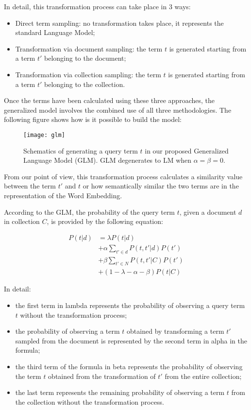 In detail, this transformation process can take place in 3 ways:
\begin{itemize}
    \item Direct term sampling: no transformation takes place, it represents the standard Language Model;
    \item Transformation via document sampling: the term $t$ is generated starting from a term ${t}'$ belonging to the document;
    \item Transformation via collection sampling: the term $t$ is generated starting from a term ${t}'$ belonging to the collection.
\end{itemize}

Once the terms have been calculated using these three approaches, the generalized model involves the combined use of all three methodologies.
The following figure shows how is it possible to build the model:

\begin{figure}[htp]
    \centering
    \texttt{[image: glm]}
    \caption[Generalized Language Model]{Schematics of generating a query term $t$ in our proposed Generalized Language Model (GLM). GLM degenerates to LM when $ \alpha = \beta = 0$.}
    \label{fig:glm}
\end{figure}

From our point of view, this transformation process calculates a similarity value between the term ${t}'$ and $t$ or how semantically similar the two terms are in the representation of the Word Embedding.

According to the GLM, the probability of the query term $t$, given a document $d$ in collection $C$, is provided by the following equation:

\begin{equation}
    \begin{split}
    P(t|d) & = \lambda P(t|d)\\
    & + \alpha \sum_{{t}'\in d}P(t,{t}'|d)P({t}')\\
    & + \beta \sum_{{t}'\in N}P(t,{t}'|C)P({t}')\\
    & + (1-\lambda-\alpha-\beta)P(t|C)
    \end{split}
\end{equation}

\clearpage

In detail:
\begin{itemize}
    \item the first term in lambda represents the probability of observing a query term $t$ without the transformation process;
    \item the probability of observing a term $t$ obtained by transforming a term ${t}'$ sampled from the document is represented by the second term in alpha in the formula;
    \item the third term of the formula in beta represents the probability of observing the term $t$ obtained from the transformation of ${t}'$ from the entire collection;
    \item the last term represents the remaining probability of observing a term $t$ from the collection without the transformation process.
\end{itemize}

